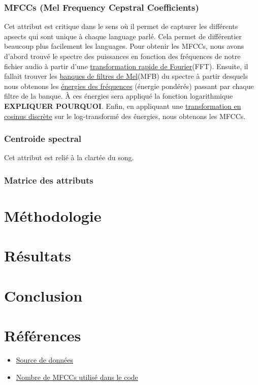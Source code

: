 \documentclass[11pt]{article}
\begin{document}
\subsubsection{MFCCs (Mel Frequency Cepstral Coefficients)}
Cet attribut est critique dans le sens où il permet de capturer les différents apsects qui sont unique à chaque language parlé. Cela permet de différentier beaucoup plus facilement les languages. Pour obtenir les MFCCs, nous avons d'abord trouvé le spectre des puissances en fonction des fréquences de notre fichier audio à partir d'une \hyperref[fft]{transformation rapide de Fourier}(FFT). Ensuite, il fallait trouver les \hyperref[mfb]{banques de filtres de Mel}(MFB) du spectre à partir desquels nous obtenons les \hyperref[freq-energy]{énergies des fréquences} (énergie pondérés) passant par chaque filtre de la banque. À ces énergies sera appliqué la fonction logarithmique \textbf{\large EXPLIQUER POURQUOI}. Enfin, en appliquant une \hyperref[dct]{transformation en cosinus discrète} sur le log-transformé des énergies, nous obtenons les MFCCs.\\

\subsubsection{Centroide spectral}
Cet attribut est relié à la clartée du song.

\subsubsection{Matrice des attributs}

\section{Méthodologie}


\section{Résultats}


\section{Conclusion}


\section{Références}
\begin{itemize}
    \item \href{https://huggingface.co/datasets/common_language}{Source de données}
    \item \href{https://ietresearch.onlinelibrary.wiley.com/doi/full/10.1049/tje2.12082#:~:text=All\%20performance\%20metrics\%20gave\%20the,studies\%20use\%20only\%2013\%20MFCCs}{Nombre de MFCCs utilisé dans le code}
\end{itemize}
\end{document}
